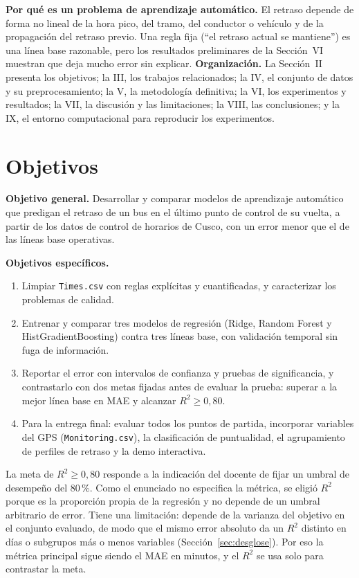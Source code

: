 \documentclass[conference,spanish]{IEEEtran}
\begin{document}
\textbf{Por qué es un problema de aprendizaje automático.} El retraso depende de forma no lineal de la hora pico, del tramo, del conductor o vehículo y de la propagación del retraso previo. Una regla fija (``el retraso actual se mantiene'') es una línea base razonable, pero los resultados preliminares de la Sección~VI muestran que deja mucho error sin explicar.
\textbf{Organización.} La Sección~II presenta los objetivos; la III, los trabajos relacionados; la IV, el conjunto de datos y su preprocesamiento; la V, la metodología definitiva; la VI, los experimentos y resultados; la VII, la discusión y las limitaciones; la VIII, las conclusiones; y la IX, el entorno computacional para reproducir los experimentos.

\section{Objetivos}

\textbf{Objetivo general.} Desarrollar y comparar modelos de aprendizaje automático que predigan el retraso de un bus en el último punto de control de su vuelta, a partir de los datos de control de horarios de Cusco, con un error menor que el de las líneas base operativas.

\textbf{Objetivos específicos.}
\begin{enumerate}
    \item Limpiar \texttt{Times.csv} con reglas explícitas y cuantificadas, y caracterizar los problemas de calidad.
    \item Entrenar y comparar tres modelos de regresión (Ridge, Random Forest y HistGradientBoosting) contra tres líneas base, con validación temporal sin fuga de información.
    \item Reportar el error con intervalos de confianza y pruebas de significancia, y contrastarlo con dos metas fijadas antes de evaluar la prueba: superar a la mejor línea base en MAE y alcanzar $R^2\ge0{,}80$.
    \item Para la entrega final: evaluar todos los puntos de partida, incorporar variables del GPS (\texttt{Monitoring.csv}), la clasificación de puntualidad, el agrupamiento de perfiles de retraso y la demo interactiva.
\end{enumerate}
La meta de $R^2\ge0{,}80$ responde a la indicación del docente de fijar un umbral de desempeño del 80\,\%. Como el enunciado no especifica la métrica, se eligió $R^2$ porque es la proporción propia de la regresión y no depende de un umbral arbitrario de error. Tiene una limitación: depende de la varianza del objetivo en el conjunto evaluado, de modo que el mismo error absoluto da un $R^2$ distinto en días o subgrupos más o menos variables (Sección~\ref{sec:desglose}). Por eso la métrica principal sigue siendo el MAE en minutos, y el $R^2$ se usa solo para contrastar la meta.
\end{document}
